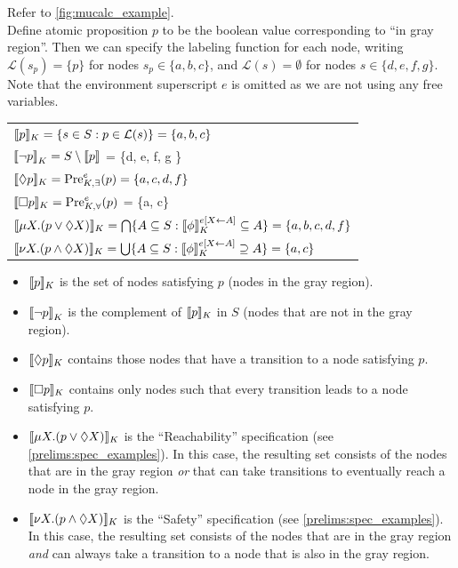 \begin{exmp}\label{mucalc_example}
Refer to \autoref{fig:mucalc_example}.\\
Define atomic proposition $p$ to be the boolean value corresponding to ``in gray region''. Then we can specify the labeling function for each node, writing $\mathcal{L}(s_p) = \{p\}$ for nodes $s_p \in \{a, b, c\}$, and $\mathcal{L}(s) = \emptyset$ for nodes $s \in \{d, e, f, g \}$. Note that the environment superscript $e$ is omitted as we are not using any free variables.

\begin{tabular}{l}\label{table:modal_mucalc_syntax}
    ${\llbracket}{} p {\rrbracket}{}_K = \{s \in S : p \in \mathcal{L}(s) \} = \{a, b, c\}$ \\    
    ${\llbracket} \lnot p {\rrbracket}_K = S \setminus {\llbracket} p {\rrbracket}$ = \{d, e, f, g \} \\
    ${\llbracket}{} \Diamond p {\rrbracket}{}_K = \text{Pre}_{K,\exists}^{e} (p) = \{a, c, d, f\}$ \\
    ${\llbracket}{} \square p {\rrbracket}{}_K = \text{Pre}_{K,\forall}^e (p)$ = \{a, c\} \\
    ${\llbracket}{} \mu X.(p \lor \Diamond X) {\rrbracket}{}_K = \bigcap \{ A \subseteq S : {\llbracket}{} \phi {\rrbracket}{}_K^{e[X \leftarrow A]} \subseteq A \} = \{ a,b,c,d,f \}$ \\
    ${\llbracket}{} \nu X.(p \land \Diamond X) {\rrbracket}{}_K = \bigcup \{ A \subseteq S : {\llbracket}{} \phi {\rrbracket}{}_K^{e[X \leftarrow A]} \supseteq A \} = \{ a, c \}$
\end{tabular}
\begin{itemize}
    \item ${\llbracket}{} p {\rrbracket}{}_K$ is the set of nodes satisfying $p$ (nodes in the gray region).
    \item ${\llbracket} \lnot p {\rrbracket}_K$ is the complement of ${\llbracket}{} p {\rrbracket}{}_K$ in $S$ (nodes that are not in the gray region).
    \item ${\llbracket}{} \Diamond p {\rrbracket}{}_K$ contains those nodes that have a transition to a node satisfying $p$.
    \item ${\llbracket}{} \square p {\rrbracket}{}_K$ contains only nodes such that every transition leads to a node satisfying $p$.
    \item ${\llbracket}{} \mu X.(p \lor \Diamond X) {\rrbracket}{}_K$ is the ``Reachability'' specification (see \autoref{prelims:spec_examples}). In this case, the resulting set consists of the nodes that are in the gray region \emph{or} that can take transitions to eventually reach a node in the gray region.
    \item ${\llbracket}{} \nu X.(p \land \Diamond X) {\rrbracket}{}_K$ is the ``Safety'' specification (see \autoref{prelims:spec_examples}). In this case, the resulting set consists of the nodes that are in the gray region \emph{and} can always take a transition to a node that is also in the gray region. 
\end{itemize}

\end{exmp}

